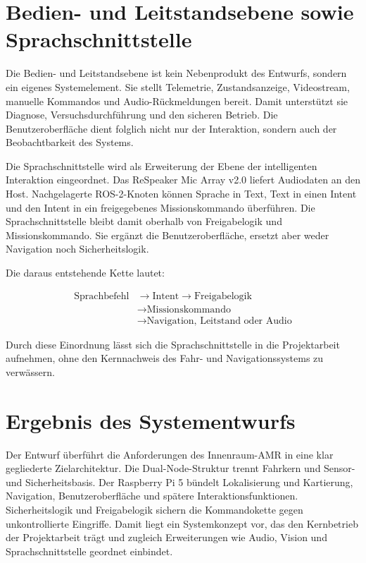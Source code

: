 \section{Bedien- und Leitstandsebene sowie Sprachschnittstelle}

Die Bedien- und Leitstandsebene ist kein Nebenprodukt des Entwurfs, sondern ein eigenes Systemelement. Sie stellt Telemetrie, Zustandsanzeige, Videostream, manuelle Kommandos und Audio-Rückmeldungen bereit. Damit unterstützt sie Diagnose, Versuchsdurchführung und den sicheren Betrieb. Die Benutzeroberfläche dient folglich nicht nur der Interaktion, sondern auch der Beobachtbarkeit des Systems.

Die Sprachschnittstelle wird als Erweiterung der Ebene der intelligenten Interaktion eingeordnet. Das ReSpeaker Mic Array v2.0 liefert Audiodaten an den Host. Nachgelagerte ROS-2-Knoten können Sprache in Text, Text in einen Intent und den Intent in ein freigegebenes Missionskommando überführen. Die Sprachschnittstelle bleibt damit oberhalb von Freigabelogik und Missionskommando. Sie ergänzt die Benutzeroberfläche, ersetzt aber weder Navigation noch Sicherheitslogik.

Die daraus entstehende Kette lautet:

\begin{align*}
  \text{Sprachbefehl} &\rightarrow \text{Intent} \rightarrow \text{Freigabelogik} \\
                      &\rightarrow \text{Missionskommando} \\
                      &\rightarrow \text{Navigation, Leitstand oder Audio}
\end{align*}

Durch diese Einordnung lässt sich die Sprachschnittstelle in die Projektarbeit aufnehmen, ohne den Kernnachweis des Fahr- und Navigationssystems zu verwässern.

\section{Ergebnis des Systementwurfs}

Der Entwurf überführt die Anforderungen des Innenraum-AMR in eine klar gegliederte Zielarchitektur. Die Dual-Node-Struktur trennt Fahrkern und Sensor- und Sicherheitsbasis. Der Raspberry Pi 5 bündelt Lokalisierung und Kartierung, Navigation, Benutzeroberfläche und spätere Interaktionsfunktionen. Sicherheitslogik und Freigabelogik sichern die Kommandokette gegen unkontrollierte Eingriffe. Damit liegt ein Systemkonzept vor, das den Kernbetrieb der Projektarbeit trägt und zugleich Erweiterungen wie Audio, Vision und Sprachschnittstelle geordnet einbindet.
